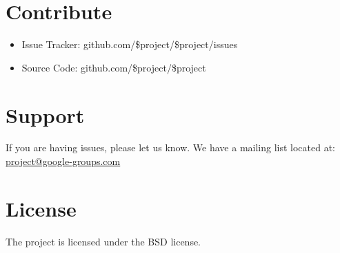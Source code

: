 \documentclass[letterpaper,10pt,english]{sphinxmanual}
\begin{document}
\section{Contribute}
\label{\detokenize{index:contribute}}\begin{itemize}
\item {} 
Issue Tracker: github.com/\$project/\$project/issues

\item {} 
Source Code: github.com/\$project/\$project

\end{itemize}


\section{Support}
\label{\detokenize{index:support}}
If you are having issues, please let us know.
We have a mailing list located at: \href{mailto:project@google-groups.com}{project@google-groups.com}


\section{License}
\label{\detokenize{index:license}}
The project is licensed under the BSD license.



\renewcommand{\indexname}{Index}
\printindex
\end{document}
